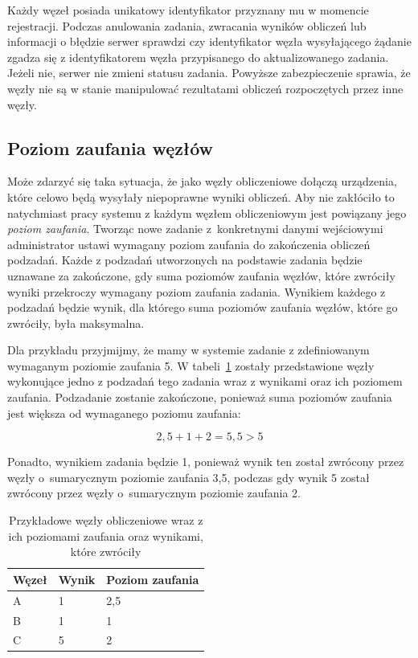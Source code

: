 \documentclass[a4paper,11pt,twoside]{report}
\theoremstyle{definition}
\begin{document}
Każdy węzeł posiada unikatowy identyfikator przyznany mu w momencie rejestracji.
Podczas anulowania zadania, zwracania wyników obliczeń lub informacji o błędzie serwer sprawdzi czy identyfikator węzła wysyłającego żądanie zgadza się z identyfikatorem węzła przypisanego do aktualizowanego zadania.
Jeżeli nie, serwer nie zmieni statusu zadania.
Powyższe zabezpieczenie sprawia, że węzły nie są w stanie manipulować rezultatami obliczeń rozpoczętych przez inne węzły.

\subsection{Poziom zaufania węzłów}
\label{poziom-zaufania-wezlow}

Może zdarzyć się taka sytuacja, że jako węzły obliczeniowe dołączą urządzenia, które celowo będą wysyłały niepoprawne wyniki obliczeń. 
Aby nie zakłóciło to natychmiast pracy systemu z każdym węzłem obliczeniowym jest powiązany jego \textit{poziom zaufania}. Tworząc nowe zadanie z~konkretnymi danymi wejściowymi administrator ustawi wymagany poziom zaufania do zakończenia obliczeń podzadań.
Każde z podzadań utworzonych na podstawie zadania będzie uznawane za zakończone, gdy suma poziomów zaufania węzłów, które zwróciły wyniki przekroczy wymagany poziom zaufania zadania.
Wynikiem każdego z podzadań będzie wynik, dla którego suma poziomów zaufania węzłów, które go zwróciły, była maksymalna.

Dla przykładu przyjmijmy, że mamy w systemie zadanie z zdefiniowanym wymaganym poziomie zaufania 5. W tabeli~\ref{trust-level-example} zostały przedstawione węzły wykonujące jedno z podzadań tego zadania wraz z wynikami oraz ich poziomem zaufania.
Podzadanie zostanie zakończone, ponieważ suma poziomów zaufania jest większa od wymaganego poziomu zaufania:

\[2,5 + 1 + 2 = 5,5 > 5\]

Ponadto, wynikiem zadania będzie 1, ponieważ wynik ten został zwrócony przez węzły o~sumarycznym poziomie zaufania 3,5, podczas gdy wynik 5 został zwrócony przez węzły o~sumarycznym poziomie zaufania 2.

\begin{table}
    \centering
    \caption{Przykładowe węzły obliczeniowe wraz z ich poziomami zaufania oraz wynikami, które zwróciły}
    \label{trust-level-example}
    \begin{tabular}{|l|l|l|}
        \hline
        Węzeł & Wynik & Poziom zaufania \\ \hline
        A     & 1     & 2,5             \\ \hline
        B     & 1     & 1               \\ \hline
        C     & 5     & 2               \\ \hline
    \end{tabular}
\end{table}
\end{document}
